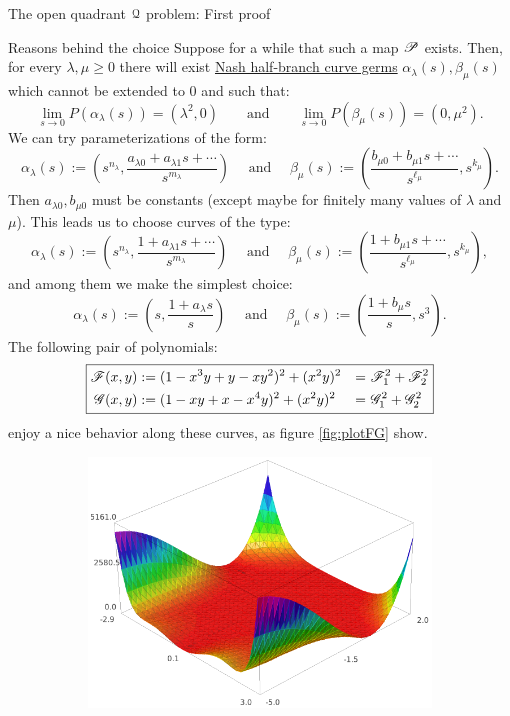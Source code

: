 \documentclass[11pt, a4paper, english, twoside, notitlepage, openright]{report}
\begin{document}
\begin{chapter}{The open quadrant $\Qu$ problem: First proof}
\begin{section}{Reasons behind the choice}
Suppose for a while that such a map $\P$ exists. Then, for every $\lambda,\mu\ge 0$ there will exist \hyperref[curveGerms]{Nash half-branch curve germs} $\alpha_{\lambda}(s),\beta_{\mu}(s)$ which cannot be extended to $0$ and such that:
$$
\lim_{s\rightarrow 0} P(\alpha_{\lambda}(s))=(\lambda^2,0)\qquad \text{and} \qquad \lim_{s\rightarrow 0} P(\beta_{\mu}(s))=(0,\mu^2).
$$
We can try parameterizations of the form:
$$
\alpha_{\lambda}(s):=\left(s^{n_{\lambda}},\frac{a_{\lambda 0}+a_{\lambda 1}s+\cdots}{s^{m_{\lambda}}}\right)
\quad \text{ and } \quad
\beta_{\mu}(s):=\left(\frac{b_{\mu 0}+b_{\mu 1}s+\cdots}{s^{\ell_{\mu}}},s^{k_{\mu}}\right).
$$
Then $a_{\lambda 0},b_{\mu 0}$ must be constants (except maybe for finitely many values of $\lambda$ and $\mu$). This leads us to choose curves of the type:
$$
\alpha_{\lambda}(s):=\left(s^{n_{\lambda}},\frac{1+a_{\lambda 1}s+\cdots}{s^{m_{\lambda}}}\right)
\quad \text{ and } \quad
\beta_{\mu}(s):=\left(\frac{1+b_{\mu 1}s+\cdots}{s^{\ell_{\mu}}},s^{k_{\mu}}\right),
$$
and among them we make the simplest choice: 
$$
\alpha_{\lambda}(s):=\left(s,\frac{1+a_{\lambda }s}{s}\right)
\quad \text{ and } \quad
\beta_{\mu}(s):=\left(\frac{1+b_{\mu }s}{s},s^{3}\right).
$$
The following pair of polynomials:
\begin{equation*}
\boxed{
\begin{aligned}
\F(x,y)&:=(1-x^3y+y-x y^2)^2+(x^2 y)^2&=&\ \F_1^2+\F_2^2 \\
\G(x,y)&:=(1-xy+x-x^4y)^2+(x^2y)^2&=&\ \G_1^2+\G_2^2\\
\end{aligned}
}
\end{equation*}
enjoy a nice behavior along these curves, as figure \ref{fig:plotFG} show.
\begin{figure}[h]\hspace{-0.15cm}
\begin{subfigure}{.49\linewidth}\centering
\includegraphics[width=1\textwidth]{plots/ch1_04_F.png}

\end{subfigure}
\end{figure}
\end{section}
\end{chapter}
\end{document}
